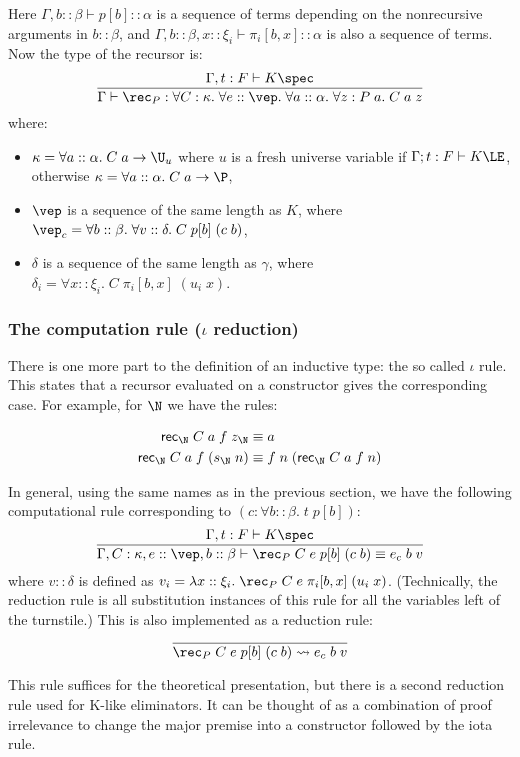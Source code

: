 Here $\Gamma,b::\beta\vdash p[b]::\alpha$ is a sequence of terms depending on the nonrecursive arguments in $b::\beta$, and $\Gamma,b::\beta,x::\xi_i\vdash \pi_i[b,x]::\alpha$ is also a sequence of terms. Now the type of the recursor is:
$$\frac{\Gamma,t:F\vdash K\spec}{\Gamma\vdash\rec_P:\forall C:\kappa.\;\forall e::\vep.\;\forall a::\alpha.\;\forall z:P\;a.\;C\;a\;z}$$
where:
\begin{itemize}
\item $\kappa=\forall a::\alpha.\;C\;a\to\U_u$ where $u$ is a fresh universe variable if $\Gamma;t:F\vdash K\LE$, otherwise $\kappa=\forall a::\alpha.\;C\;a\to\P$,
\item $\vep$ is a sequence of the same length as $K$, where $\vep_c=\forall b::\beta.\;\forall v::\delta.\;C\;p[b]\;(c\;b)$,
\item $\delta$ is a sequence of the same length as $\gamma$, where $\delta_i=\forall x::\xi_i.\;C\;\pi_i[b,x]\;(u_i\;x)$.
\end{itemize}

\subsubsection{The computation rule ($\iota$ reduction)}

There is one more part to the definition of an inductive type: the so called $\iota$ rule. This states that a recursor evaluated on a constructor gives the corresponding case. For example, for $\N$ we have the rules:

\begin{align*}
\mathsf{rec}_\N\;C\;a\;f\;z_\N&\equiv a\\
\mathsf{rec}_\N\;C\;a\;f\;(s_\N\;n)&\equiv f\;n\;(\mathsf{rec}_\N\;C\;a\;f\;n)
\end{align*}

In general, using the same names as in the previous section, we have the following computational rule corresponding to $(c:\forall b::\beta.\;t\;p[b])$:
$$\frac{\Gamma,t:F\vdash K\spec}{\Gamma,C:\kappa,e::\vep,b::\beta\vdash\rec_P\;C\;e\;p[b]\;(c\;b)\equiv e_c\;b\;v}$$
where $v::\delta$ is defined as $v_i=\lambda x::\xi_i.\;\rec_P\;C\;e\;\pi_i[b,x]\;(u_i\;x)$. (Technically, the reduction rule is all substitution instances of this rule for all the variables left of the turnstile.) This is also implemented as a reduction rule:
$$\frac{}{\rec_P\;C\;e\;p[b]\;(c\;b)\rightsquigarrow e_c\;b\;v}$$

This rule suffices for the theoretical presentation, but there is a second reduction rule used for K-like eliminators. It can be thought of as a combination of proof irrelevance to change the major premise into a constructor followed by the iota rule.


